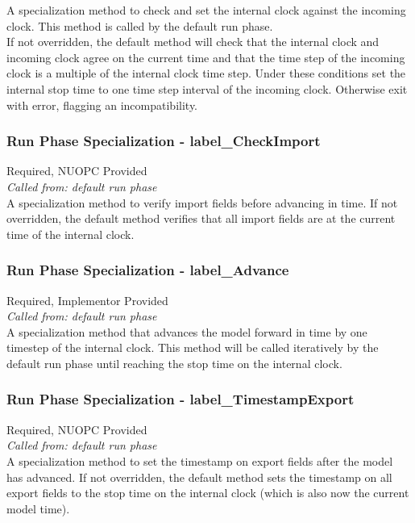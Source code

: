 A specialization method to check and set the internal clock against the incoming clock. This method is called by the default run phase.\\

If not overridden, the default method will check that the internal clock and incoming clock agree on the current time and that the time step of the incoming clock is a multiple of the internal clock time step. Under these conditions set the internal stop time to one time step interval of the incoming clock. Otherwise exit with error, flagging an incompatibility.

\subsubsection{Run Phase Specialization - label\_CheckImport}
{\sc Required, NUOPC Provided}\\
{\em Called from: default run phase}\\

A specialization method to verify import fields before advancing in time. If not overridden, the default method verifies that all import fields are at the current time of the internal clock.

\subsubsection{Run Phase Specialization - label\_Advance}
{\sc Required, Implementor Provided}\\
{\em Called from: default run phase}\\

A specialization method that advances the model forward in time by one timestep of the internal clock. This method will be called iteratively by the default run phase until reaching the stop time on the internal clock.

\subsubsection{Run Phase Specialization - label\_TimestampExport}
{\sc Required, NUOPC Provided}\\
{\em Called from: default run phase}\\

A specialization method to set the timestamp on export fields after the model has advanced. If not overridden, the default method sets the timestamp on all export fields to the stop time on the internal clock (which is also now the current model time).

